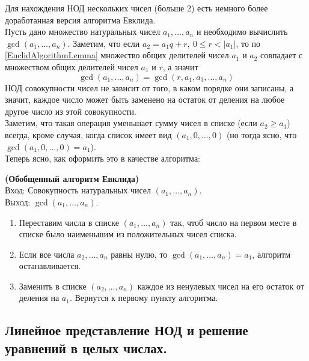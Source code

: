 \documentclass[11pt]{article}
\begin{document}
	Для нахождения НОД нескольких чисел (больше 2) есть немного более доработанная версия алгоритма Евклида. \\
	Пусть дано множество натуральных чисел $a_1, \ldots, a_n$ и необходимо вычислить $\gcd(a_1, \ldots, a_n)$.
	Заметим, что если $a_2 = a_1 q + r, \ 0 \le r < |a_1|$, то по \ref{EuclidAlgorithmLemma} множество общих делителей
	чисел $a_1$ и $a_2$ совпадает с множеством общих делителей чисел $a_1$ и $r$, а значит
	\[ \gcd(a_1, \ldots, a_n) = \gcd(r, a_1, a_3, \ldots, a_n)\]
	НОД совокупности чисел не зависит от того, в каком порядке они записаны, а значит, каждое число может быть заменено на
	остаток от деления на любое другое число из этой совокупности. \\
	Заметим, что такая операция уменьшает сумму чисел в списке (если $a_2 \ge a_1$) всегда, кроме случая, когда
	список имеет вид $(a_1, 0, \ldots, 0)$ (но тогда ясно, что $\gcd(a_1, 0, \ldots, 0) = a_1$).\\
	Теперь ясно, как оформить это в качестве алгоритма:
	\begin{theorem} \textbf{(Обобщенный алгоритм Евклида)}\\
	\textsc{Вход:} Совокупность натуральных чисел  $(a_1, \ldots, a_n)$.\\
	\textsc{Выход:} $\gcd(a_1, \ldots, a_n)$.
		\begin{enumerate}

			\item Переставим числа в списке $(a_1, \ldots, a_n)$ так, чтоб число на первом месте в списке было наименьшим из
				  положительных чисел списка.

			\item Если все числа $a_2, \ldots, a_n$ равны нулю, то $\gcd(a_1, \ldots, a_n) = a_1$, алгоритм останавливается.

			\item Заменить в списке $(a_2, \ldots, a_n)$ каждое из ненулевых чисел на его остаток от деления на $a_1$. Вернутся к первому
				  пункту алгоритма.

		\end{enumerate}
	\end{theorem}
\subsection{Линейное представление НОД и решение уравнений в целых числах.}
\end{document}
